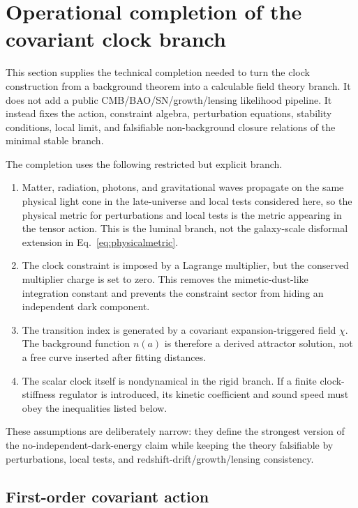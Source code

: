 \documentclass[aps,prd,reprint,nofootinbib,superscriptaddress,longbibliography]{revtex4-2}
\begin{document}
\section{Operational completion of the covariant clock branch}
\label{sec:operational_completion}

This section supplies the technical completion needed to turn the clock construction from a background theorem into a calculable field theory branch.  It does not add a public CMB/BAO/SN/growth/lensing likelihood pipeline.  It instead fixes the action, constraint algebra, perturbation equations, stability conditions, local limit, and falsifiable non-background closure relations of the minimal stable branch.

The completion uses the following restricted but explicit branch.
\begin{enumerate}
  \item Matter, radiation, photons, and gravitational waves propagate on the same physical light cone in the late-universe and local tests considered here, so the physical metric for perturbations and local tests is the metric appearing in the tensor action.  This is the luminal branch, not the galaxy-scale disformal extension in Eq.~\eqref{eq:physicalmetric}.
  \item The clock constraint is imposed by a Lagrange multiplier, but the conserved multiplier charge is set to zero.  This removes the mimetic-dust-like integration constant and prevents the constraint sector from hiding an independent dark component.
  \item The transition index is generated by a covariant expansion-triggered field $\chi$.  The background function $n(a)$ is therefore a derived attractor solution, not a free curve inserted after fitting distances.
  \item The scalar clock itself is nondynamical in the rigid branch.  If a finite clock-stiffness regulator is introduced, its kinetic coefficient and sound speed must obey the inequalities listed below.
\end{enumerate}
These assumptions are deliberately narrow: they define the strongest version of the no-independent-dark-energy claim while keeping the theory falsifiable by perturbations, local tests, and redshift-drift/growth/lensing consistency.

\subsection{First-order covariant action}
\label{subsec:first_order_action}
\end{document}
